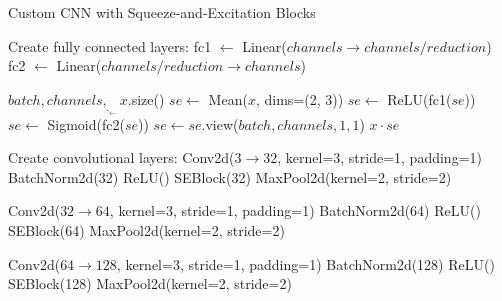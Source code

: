 \documentclass[a4paper,12pt]{article}
\begin{document}
                        \begin{algorithm}
                            \caption{Custom CNN with Squeeze-and-Excitation Blocks}
                            \begin{algorithmic}[1]
                                \State Create fully connected layers:
                                \Indent
                                    \State fc1 $\gets$ Linear($channels \to channels/reduction$)
                                    \State fc2 $\gets$ Linear($channels/reduction \to channels$)
                                \EndIndent
                            \EndFunction
                            
                                \State $batch, channels, _, _ \gets x$.size()
                                \State $se \gets$ Mean($x$, dims=(2, 3)) 
                                \State $se \gets$ ReLU(fc1($se$))
                                \State $se \gets$ Sigmoid(fc2($se$))
                                \State $se \gets se$.view($batch, channels, 1, 1$)
                                \State \Return $x \cdot se$ 
                            \EndFunction
                            
                                \State Create convolutional layers:
                                \Indent
                                    \State Conv2d($3 \to 32$, kernel=3, stride=1, padding=1)
                                    \State BatchNorm2d(32)
                                    \State ReLU()
                                    \State SEBlock(32)
                                    \State MaxPool2d(kernel=2, stride=2)
                                    
                                    \State Conv2d($32 \to 64$, kernel=3, stride=1, padding=1)
                                    \State BatchNorm2d(64)
                                    \State ReLU()
                                    \State SEBlock(64)
                                    \State MaxPool2d(kernel=2, stride=2)
                                    
                                    \State Conv2d($64 \to 128$, kernel=3, stride=1, padding=1)
                                    \State BatchNorm2d(128)
                                    \State ReLU()
                                    \State SEBlock(128)
                                    \State MaxPool2d(kernel=2, stride=2)
                                \EndIndent
                                

\end{algorithmic}
\end{algorithm}
\end{document}
